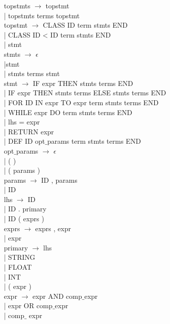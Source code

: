 \documentclass{article}
\begin{document}
\noindent topstmts $\rightarrow$ topstmt \\
       \hspace{1cm}  | topstmts terms topstmt \\

\noindent topstmt $\rightarrow$ CLASS ID term stmts END \\
| CLASS ID < ID term stmts END \\
| stmt \\

\noindent stmts $\rightarrow$ $\epsilon$ \\
|stmt \\
| stmts terms stmt \\

\noindent stmt $\rightarrow$ IF expr THEN stmts terms END \\
| IF expr THEN stmts terms ELSE stmts terms END \\
| FOR ID IN expr TO expr term stmts terms END \\
| WHILE expr DO term stmts terms END \\
| lhs = expr \\
| RETURN expr \\
| DEF ID opt$\_$params term stmts terms END \\

\noindent opt$\_$params $\rightarrow$ $\epsilon$ \\
| ( ) \\
| ( params ) \\

\noindent params $\rightarrow$ ID , params \\
| ID \\

\noindent lhs $\rightarrow$ ID \\
| ID . primary \\
| ID ( exprs ) \\

\noindent exprs $\rightarrow$ exprs , expr \\
| expr \\

\noindent primary $\rightarrow$ lhs \\
| STRING \\
| FLOAT \\
| INT \\
| ( expr ) \\

\noindent expr $\rightarrow$ expr AND comp$\_$expr \\
| expr OR comp$\_$expr \\
| comp$\_$ expr \\
\end{document}
